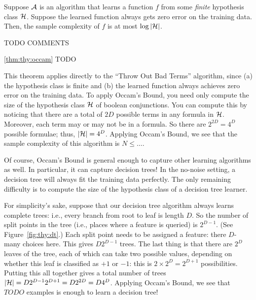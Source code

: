 \begin{theorem} \label{thm:thy:occam}
  Suppose $\mathcal{A}$ is an algorithm that learns a function $f$ from some
  \emph{finite} hypothesis class $\mathcal{H}$.  Suppose the learned function
  always gets zero error on the training data.  Then, the sample
  complexity of $f$ is at most $\log \left\vert \mathcal{H} \right\vert$.
\end{theorem}

TODO COMMENTS

\begin{myproof}{\ref{thm:thy:occam}}
  TODO
\end{myproof}

This theorem applies directly to the ``Throw Out Bad Terms''
algorithm, since (a) the hypothesis class is finite and (b) the
learned function always achieves zero error on the training data.  To
apply Occam's Bound, you need only compute the size of the hypothesis
class $\mathcal{H}$ of boolean conjunctions.  You can compute this by noticing
that there are a total of $2D$ possible terms in any formula in
$\mathcal{H}$.  Moreover, each term may or may not be in a formula.  So there
are $2^{2D} = 4^D$ possible formulae; thus, $\left\vert \mathcal{H} \right\vert = 4^D$.
Applying Occam's Bound, we see that the sample complexity of this
algorithm is $N \leq \dots$.

Of course, Occam's Bound is general enough to capture other learning
algorithms as well.  In particular, it can capture decision trees!  In
the no-noise setting, a decision tree will always fit the training
data perfectly.  The only remaining difficulty is to compute the size
of the hypothesis class of a decision tree learner.


For simplicity's sake, suppose that our decision tree algorithm always
learns complete trees: i.e., every branch from root to leaf is length
$D$.  So the number of split points in the tree (i.e., places where a
feature is queried) is $2^{D-1}$.  (See Figure~\ref{fig:thy:dt}.)
Each split point needs to be assigned a feature: there $D$-many
choices here.  This gives $D 2^{D-1}$ trees.  The last thing is that
there are $2^D$ leaves of the tree, each of which can take two
possible values, depending on whether this leaf is classified as $+1$
or $-1$: this is $2 \times 2^D = 2^{D+1}$ possibilities.  Putting this
all together gives a total number of trees $\left\vert \mathcal{H} \right\vert = D 2^{D-1}
2^{D+1} = D 2^{2D} = D 4^D$.  Applying Occam's Bound, we see that
$TODO$ examples is enough to learn a decision tree!

